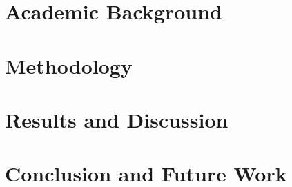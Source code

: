 \documentclass[11pt,a4paper]{report}
\begin{document}
\chapter{Academic Background}


\chapter{Methodology}


\chapter{Results and Discussion}


\chapter{Conclusion and Future Work}


\newpage

\appendix

\end{document}
